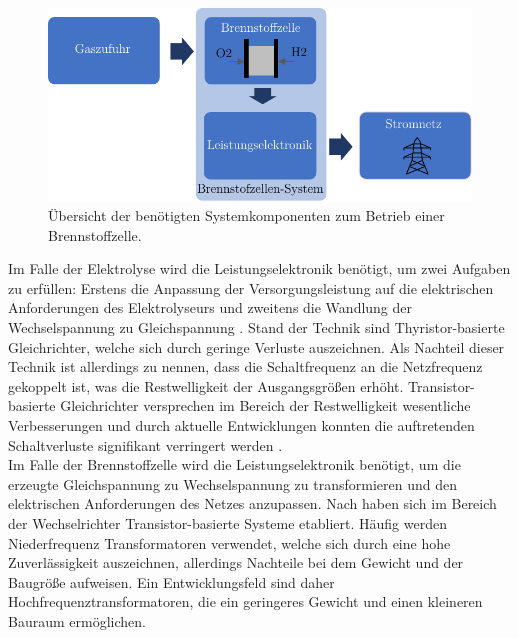 \begin{figure}[h]
	\centering
		\includegraphics[scale=1]{Figures/BrennstoffzelleProzessschritte}
		\caption{Übersicht der benötigten Systemkomponenten zum Betrieb einer Brennstoffzelle.}
\label{fig:ProzessBrennstoffzelle}	
\end{figure}

Im Falle der Elektrolyse wird die Leistungselektronik benötigt, um zwei Aufgaben zu erfüllen:
Erstens die Anpassung der Versorgungsleistung auf die elektrischen Anforderungen des Elektrolyseurs und zweitens die Wandlung der Wechselspannung zu Gleichspannung \citep{tjarks_pem-elektrolyse-systeme_2017}.
Stand der Technik sind Thyristor-basierte Gleichrichter, welche sich durch geringe Verluste auszeichnen.
Als Nachteil dieser Technik ist allerdings zu nennen, dass die Schaltfrequenz an die Netzfrequenz gekoppelt ist, was die Restwelligkeit der Ausgangsgrößen erhöht.
Transistor-basierte Gleichrichter versprechen im Bereich der Restwelligkeit wesentliche Verbesserungen und durch aktuelle Entwicklungen konnten die auftretenden Schaltverluste  signifikant verringert werden \citep{tjarks_pem-elektrolyse-systeme_2017}.\\

Im Falle der Brennstoffzelle wird die Leistungselektronik benötigt, um die erzeugte Gleichspannung zu Wechselspannung zu transformieren und den elektrischen Anforderungen des Netzes anzupassen.
Nach \citet{engler_wechselrichter_nodate} haben sich im Bereich der Wechselrichter Transistor-basierte Systeme etabliert.
Häufig werden Niederfrequenz Transformatoren verwendet, welche sich durch eine hohe Zuverlässigkeit auszeichnen, allerdings Nachteile bei dem Gewicht und der Baugröße aufweisen.
Ein Entwicklungsfeld sind daher Hochfrequenztransformatoren, die ein geringeres Gewicht und einen kleineren Bauraum ermöglichen.